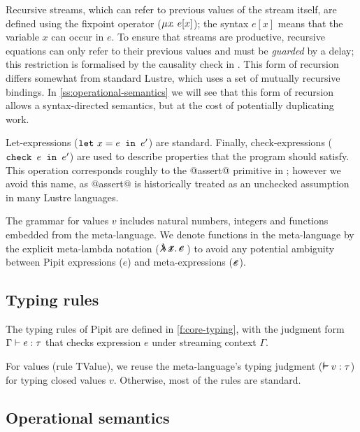 \documentclass[sigplan,screen]{acmart}
\begin{document}
Recursive streams, which can refer to previous values of the stream itself, are defined using the fixpoint operator ($\mu{} x \!.~e[x]$); the syntax $e[x]$ means that the variable $x$ can occur in $e$.
To ensure that streams are productive, recursive equations can only refer to their previous values and must be \emph{guarded} by a delay; this restriction is formalised by the causality check in \REF{}.
This form of recursion differs somewhat from standard Lustre, which uses a set of mutually recursive bindings.
In \autoref{ss:operational-semantics} we will see that this form of recursion allows a syntax-directed semantics, but at the cost of potentially duplicating work.

Let-expressions ($\texttt{let}~x = e \texttt{~in~} e'$) are standard.
Finally, check-expressions ($\texttt{check~} e \texttt{~in~} e'$) are used to describe properties that the program should satisfy.
This operation corresponds roughly to the @assert@ primitive in \fstar{}; however we avoid this name, as @assert@ is historically treated as an unchecked assumption in many Lustre languages.

The grammar for values $v$ includes natural numbers, integers and functions embedded from the \fstar{} meta-language.
We denote functions in the meta-language by the explicit meta-lambda notation ($\mlamX{}$) to avoid any potential ambiguity between Pipit expressions ($e$) and meta-expressions ($\metafy{e}$).

\subsection{Typing rules}
\label{ss:typing-rules}

The typing rules of Pipit are defined in \autoref{f:core-typing}, with the judgment form $\Gamma \vdash e : \tau$ that checks expression $e$ under streaming context $\Gamma$.

For values (rule TValue), we reuse the \fstar{} meta-language's typing judgment ($\mtyping{}{v}{\tau}$) for typing closed values $v$.
Otherwise, most of the rules are standard.

\subsection{Operational semantics}
\label{ss:operational-semantics}
\end{document}
